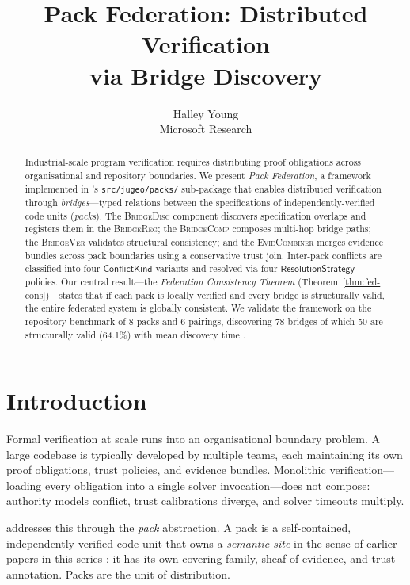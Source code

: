 \documentclass[11pt]{article}
\title{\textbf{Pack Federation: Distributed Verification\\
       via Bridge Discovery}}
\author{Halley Young \\ Microsoft Research}
\date{}
\newcommand{\ConflK}{\ensuremath{\mathsf{ConflictKind}}}
\newcommand{\ResolS}{\ensuremath{\mathsf{ResolutionStrategy}}}
\newcommand{\BR}{\textsc{BridgeReg}}
\newcommand{\BD}{\textsc{BridgeDisc}}
\newcommand{\BC}{\textsc{BridgeComp}}
\newcommand{\BVer}{\textsc{BridgeVer}}
\newcommand{\EC}{\textsc{EvidCombiner}}
\begin{document}
\maketitle

\begin{abstract}
Industrial-scale program verification requires distributing proof
obligations across organisational and repository boundaries.  We present
\emph{Pack Federation}, a framework implemented in \JuGeo's
\texttt{src/jugeo/packs/} sub-package that enables distributed
verification through \emph{bridges}---typed relations between the
specifications of independently-verified code units (\emph{packs}).
The \BD{} component discovers specification overlaps and registers them
in the \BR{}; the \BC{} composes multi-hop bridge paths; the \BVer{}
validates structural consistency; and the \EC{} merges evidence bundles
across pack boundaries using a conservative trust join.
Inter-pack conflicts are classified into four \ConflK{} variants and
resolved via four \ResolS{} policies.
Our central result---the \emph{Federation Consistency Theorem}
(Theorem~\ref{thm:fed-cons})---states that if each pack is locally
verified and every bridge is structurally valid, the entire federated
system is globally consistent.
We validate the framework on the repository benchmark of 8 packs and 6
pairings, discovering 78 bridges of which 50 are structurally valid
(64.1\%) with mean discovery time \medtime{}.
\end{abstract}

\newpage

\section{Introduction}
\label{sec:intro}

Formal verification at scale runs into an organisational boundary
problem.  A large codebase is typically developed by multiple teams,
each maintaining its own proof obligations, trust policies, and
evidence bundles.  Monolithic verification---loading every obligation
into a single solver invocation---does not compose: authority models
conflict, trust calibrations diverge, and solver timeouts multiply.

\JuGeo{} addresses this through the \emph{pack} abstraction.  A pack
is a self-contained, independently-verified code unit that owns a
\emph{semantic site} in the sense of earlier papers in this series
\cite{jugeo01,jugeo02}: it has its own covering family, sheaf of
evidence, and trust annotation.  Packs are the unit of distribution.
\end{document}
